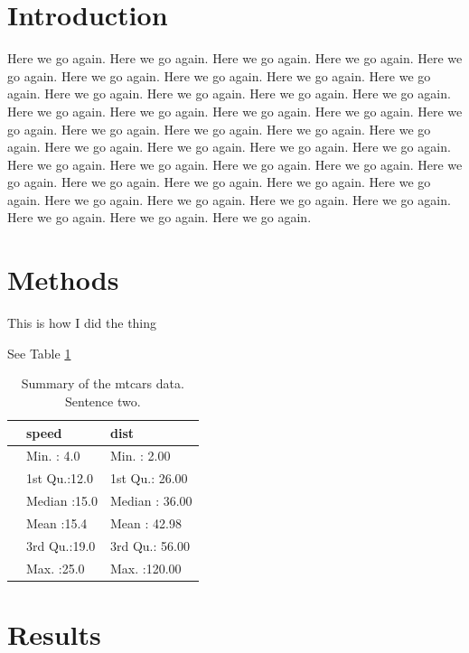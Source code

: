\documentclass[
  10pt,
]{report}
\begin{document}
\hypertarget{introduction-1}{%
\section{Introduction}\label{introduction-1}}

Here we go again. Here we go again. Here we go again. Here we go again. Here we go again. Here we go again. Here we go again. Here we go again. Here we go again. Here we go again. Here we go again. Here we go again. Here we go again. Here we go again. Here we go again. Here we go again. Here we go again. Here we go again. Here we go again. Here we go again. Here we go again. Here we go again. Here we go again. Here we go again. Here we go again. Here we go again. Here we go again. Here we go again. Here we go again. Here we go again. Here we go again. Here we go again. Here we go again. Here we go again. Here we go again. Here we go again. Here we go again. Here we go again. Here we go again. Here we go again. Here we go again. Here we go again.

\hypertarget{methods-1}{%
\section{Methods}\label{methods-1}}

This is how I did the thing

See Table \ref{tab:testtable-3}

\begin{table}

\caption[Summary of the mtcars data.]{\label{tab:testtable-3}Summary of the mtcars data. Sentence two.}
\centering
\begin{tabular}[t]{l|l|l}
\hline
  &     speed &      dist\\
\hline
 & Min.   : 4.0 & Min.   :  2.00\\
\hline
 & 1st Qu.:12.0 & 1st Qu.: 26.00\\
\hline
 & Median :15.0 & Median : 36.00\\
\hline
 & Mean   :15.4 & Mean   : 42.98\\
\hline
 & 3rd Qu.:19.0 & 3rd Qu.: 56.00\\
\hline
 & Max.   :25.0 & Max.   :120.00\\
\hline
\end{tabular}
\end{table}

\hypertarget{results}{%
\section{Results}\label{results}}
\end{document}
